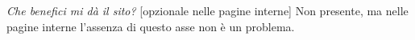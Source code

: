 \textit{Che benefici mi dà il sito?} [opzionale nelle pagine interne] \newline
Non presente, ma nelle pagine interne l'assenza di questo asse non è un problema.